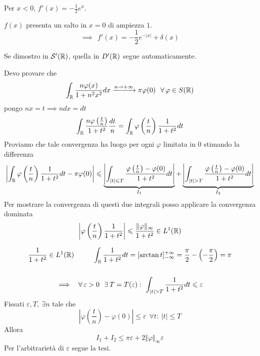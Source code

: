 Per $x< 0$, $f'( x) =-\frac{1}{2} e^{x}$.

$f( x)$ presenta un salto in $x=0$ di ampiezza $1$.
\begin{equation*}
\implies \ \ f'( x) =-\frac{1}{2} e^{-| x| } +\delta ( x)
\end{equation*}
\Soluzione


Se dimostro in $\mathcal{S}  '(\mathbb{R} )$, quella in $D'(\mathbb{R} )$ segue automaticamente.

Devo provare che
\begin{equation*}
\int _{\RR }\frac{n\varphi ( x)}{1+n^{2} x^{2}} dx\xrightarrow{n\rightarrow +\infty } \pi \varphi ( 0) \ \ \forall \varphi \in S(\RR )
\end{equation*}
pongo $nx=t\implies ndx=dt$
\begin{equation*}
\int _{\mathbb{R} }\frac{n\varphi \left(\frac{t}{n}\right)}{1+t^{2}}\frac{dt}{n} =\int _{\mathbb{R} } \varphi \left(\frac{t}{n}\right)\frac{1}{1+t^{2}} dt
\end{equation*}
Proviamo che tale convergenza ha luogo per ogni $\varphi $ limitata in $0$ stimando la differenza
\begin{equation*}
\left| \int _{\mathbb{R} } \varphi \left(\frac{t}{n}\right)\frac{1}{1+t^{2}} dt-\pi \varphi ( 0)\right| \leqslant \underbrace{\left| \int _{| t| \leqslant T}\frac{\varphi \left(\frac{t}{n}\right) -\varphi ( 0)}{1+t^{2}} dt\right| }_{I_{1}} +\underbrace{\left| \int _{| t|  >T}\frac{\varphi \left(\frac{t}{n}\right) -\varphi ( 0)}{1+t^{2}} dt\right| }_{I_{2}}
\end{equation*}
Per mostrare la convergenza di questi due integrali posso applicare la convergenza dominata
\begin{equation*}
\left| \varphi \left(\frac{t}{n}\right)\frac{1}{1+t^{2}}\right| \leqslant \frac{\Vert \varphi \Vert _{\infty }}{1+t^{2}} \in L^{1}(\mathbb{R} )
\end{equation*}
\begin{rem}
\begin{gather*}
\frac{1}{1+t^{2}} \in L^{1}(\RR ) \ \ \ \ \ \ \ \ \int _{\RR }\frac{1}{1+t^{2}} dt=[\arctan t]^{+\infty }_{-\infty } =\frac{\pi }{2} -\left( -\frac{\pi }{2}\right) =\pi \\
\\
\implies \ \ \forall \varepsilon  >0\ \ \exists T=T( \varepsilon ) :\ \int _{| t|  >T}\frac{1}{1+t^{2}} dt\leqslant \varepsilon 
\end{gather*}
Fissati $\varepsilon ,T,\ \exists n$ tale che
\begin{equation*}
\left| \varphi \left(\frac{t}{n}\right) -\varphi ( 0)\right| \leqslant \varepsilon \ \ \forall t:\ | t| \leqslant T
\end{equation*}
Allora
\begin{equation*}
I_{1} +I_{2} \leqslant \pi \varepsilon +2\Vert \varphi \Vert _{\infty } \varepsilon 
\end{equation*}
Per l'arbitrarietà di $\varepsilon $ segue la tesi.
\end{rem}
\Soluzione

